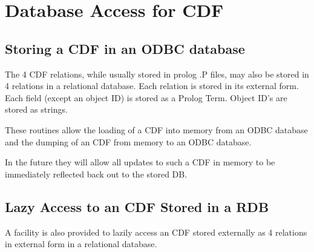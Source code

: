 \section{Database Access for CDF} \label{sec:database} 

\subsection{Storing a CDF in an ODBC database}

The 4 CDF relations, while usually stored in prolog .P files, may also
be stored in 4 relations in a relational database.  Each relation is
stored in its external form.  Each field (except an object ID) is
stored as a Prolog Term.  Object ID's are stored as strings.

These routines allow the loading of a CDF into memory from an ODBC
database and the dumping of an CDF from memory to an ODBC database.

In the future they will allow all updates to such a CDF in memory to
be immediately reflected back out to the stored DB.

\subsection{Lazy Access to an CDF Stored in a RDB}

A facility is also provided to lazily access an CDF stored externally
as 4 relations in external form in a relational database.


